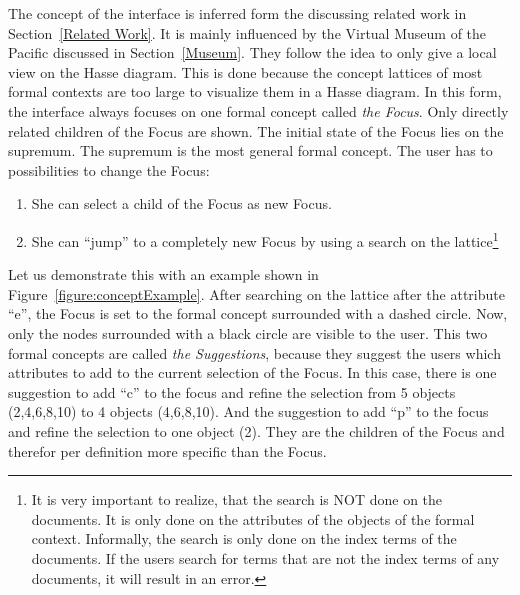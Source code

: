 \documentclass[11pt]{report}
\begin{document}
The concept of the interface is inferred form the discussing related work in Section~\ref{Related Work}. It is mainly influenced by the Virtual Museum of the Pacific discussed in Section~\ref{Museum}. They follow the idea to only give a local view on the Hasse diagram. This is done because the concept lattices of most formal contexts are too large to visualize them in a Hasse diagram. In this form, the interface always focuses on one formal concept called \textit{the Focus}. Only directly related children of the Focus are shown. The initial state of the Focus lies on the supremum. The supremum is the most general formal concept. The user has to possibilities to change the Focus:
\begin{enumerate}
	\item She can select a child of the Focus as new Focus.
	\item She can ``jump'' to a completely new Focus by using a search on the lattice\footnote{It is very important to realize, that the search is NOT done on the documents. It is only done on the attributes of the objects of the formal context. Informally, the search is only done on the index terms of the documents. If the users search for terms that are not the index terms of any documents, it will result in an error.}
\end{enumerate}
Let us demonstrate this with an example shown in Figure~\ref{figure:conceptExample}. After searching on the lattice after the attribute ``e'', the Focus is set to the formal concept surrounded with a dashed circle. Now, only the nodes surrounded with a black circle are visible to the user. This two formal concepts are called \textit{the Suggestions}, because they suggest the users which attributes to add to the current selection of the Focus. In this case, there is one suggestion to add ``c'' to the focus and refine the selection from 5 objects (2,4,6,8,10) to 4 objects (4,6,8,10). And the suggestion to add ``p'' to the focus and refine the selection to one object (2). They are the children of the Focus and therefor per definition more specific than the Focus. \\
\end{document}

